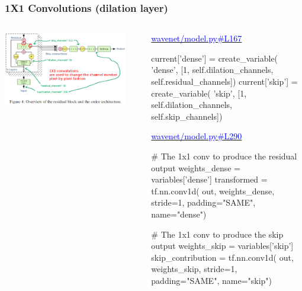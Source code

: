 \documentclass[8pt]{beamer}
\begin{document}
\begin{frame}[fragile]
\frametitle{1X1 Convolutions (dilation layer)}
\begin{columns}
\begin{column}{0.5\textwidth}
 
\includegraphics[width=0.9\textwidth]{./dl3_images/1x1_convolutions_2.png}

\end{column}
\begin{column}{0.5\textwidth}
 
\href{https://github.com/ibab/tensorflow-wavenet/blob/master/wavenet/model.py\#L167}{\textcolor{blue}{wavenet/model.py\#L167}}
 
\begin{verbnobox}[\tiny]
    current['dense'] = create_variable(
        'dense',
        [1,
            self.dilation_channels,
            self.residual_channels])
    current['skip'] = create_variable(
        'skip',
        [1,
            self.dilation_channels,
            self.skip_channels])
\end{verbnobox}

\href{https://github.com/ibab/tensorflow-wavenet/blob/master/wavenet/model.py\#L290}{\textcolor{blue}{wavenet/model.py\#L290}}
 
 \begin{verbnobox}[\tiny]
    # The 1x1 conv to produce the residual output
    weights_dense = variables['dense']
    transformed = tf.nn.conv1d(
        out, weights_dense, stride=1, padding="SAME", name="dense")

    # The 1x1 conv to produce the skip output
    weights_skip = variables['skip']
    skip_contribution = tf.nn.conv1d(
        out, weights_skip, stride=1, padding="SAME", name="skip")
\end{verbnobox}

\end{column}
\end{columns} 
 
\end{frame}
\end{document}
